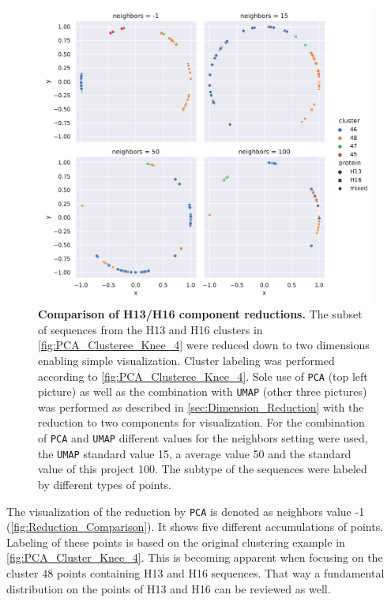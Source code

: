 \begin{figure}[!hbt]
    \centering
    \includegraphics[width=\textwidth]{PCA/Difference_Segment_4_H_metric_cosine.pdf}
    \caption[Comparison of H13/H16 component reductions]{\textbf{Comparison of H13/H16 component reductions.} The subset of sequences from the H13 and H16 clusters in \autoref{fig:PCA_Clusteree_Knee_4} were reduced down to two dimensions enabling simple visualization. Cluster labeling was performed according to \autoref{fig:PCA_Clusteree_Knee_4}. Sole use of \texttt{PCA} (top left picture) as well as the combination with \texttt{UMAP} (other three pictures) was performed as described in \autoref{sec:Dimension_Reduction} with the reduction to two components for visualization. For the combination of \texttt{PCA} and \texttt{UMAP} different values for the neighbors setting were used, the \texttt{UMAP} standard value 15, a average value 50 and the standard value of this project 100. The subtype of the sequences were labeled by different types of points.}
    \label{fig:Reduction_Comparison}
\end{figure}

\vspace{1em}

The visualization of the reduction by \texttt{PCA} is denoted as neighbors value -1 (\autoref{fig:Reduction_Comparison}). It shows five different accumulations of points. Labeling of these points is based on the original clustering example in \autoref{fig:PCA_Cluster_Knee_4}. This is becoming apparent when focusing on the cluster 48 points containing H13 and H16 sequences. That way a fundamental distribution on the points of H13 and H16 can be reviewed as well. 

